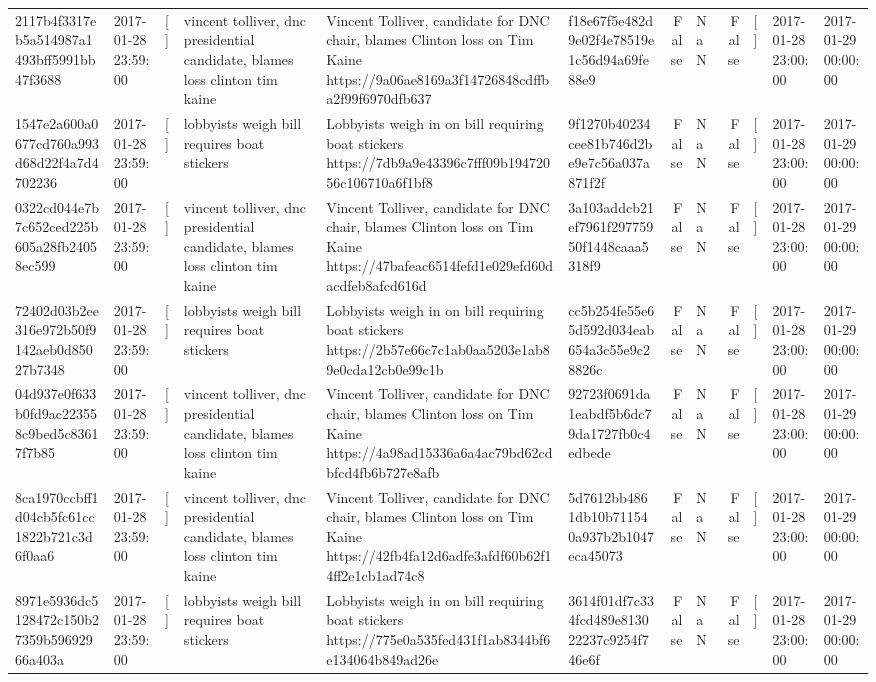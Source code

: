 \begin{tabular}{llllllrlrlll}
2117b4f3317eb5a514987a1493bff5991bb47f3688 & 2017-01-28 23:59:00 & [] & vincent tolliver, dnc presidential candidate, blames loss clinton tim kaine & Vincent Tolliver, candidate for DNC chair, blames Clinton loss on Tim Kaine https://9a06ae8169a3f14726848cdffba2f99f6970dfb637 & f18e67f5e482d9e02f4e78519e1c56d94a69fe88e9 & False & NaN & False & [] & 2017-01-28 23:00:00 & 2017-01-29 00:00:00 \\
1547e2a600a0677cd760a993d68d22f4a7d4702236 & 2017-01-28 23:59:00 & [] & lobbyists weigh bill requires boat stickers & Lobbyists weigh in on bill requiring boat stickers https://7db9a9e43396c7fff09b19472056c106710a6f1bf8 & 9f1270b40234cee81b746d2be9e7c56a037a871f2f & False & NaN & False & [] & 2017-01-28 23:00:00 & 2017-01-29 00:00:00 \\
0322cd044e7b7c652ced225b605a28fb24058ec599 & 2017-01-28 23:59:00 & [] & vincent tolliver, dnc presidential candidate, blames loss clinton tim kaine & Vincent Tolliver, candidate for DNC chair, blames Clinton loss on Tim Kaine https://47bafeac6514fefd1e029efd60dacdfeb8afcd616d & 3a103addcb21ef7961f29775950f1448caaa5318f9 & False & NaN & False & [] & 2017-01-28 23:00:00 & 2017-01-29 00:00:00 \\
72402d03b2ee316e972b50f9142aeb0d85027b7348 & 2017-01-28 23:59:00 & [] & lobbyists weigh bill requires boat stickers & Lobbyists weigh in on bill requiring boat stickers https://2b57e66c7c1ab0aa5203e1ab89e0cda12cb0e99c1b & cc5b254fe55e65d592d034eab654a3c55e9c28826c & False & NaN & False & [] & 2017-01-28 23:00:00 & 2017-01-29 00:00:00 \\
04d937e0f633b0fd9ac223558c9bed5c83617f7b85 & 2017-01-28 23:59:00 & [] & vincent tolliver, dnc presidential candidate, blames loss clinton tim kaine & Vincent Tolliver, candidate for DNC chair, blames Clinton loss on Tim Kaine https://4a98ad15336a6a4ac79bd62cdbfcd4fb6b727e8afb & 92723f0691da1eabdf5b6dc79da1727fb0c4edbede & False & NaN & False & [] & 2017-01-28 23:00:00 & 2017-01-29 00:00:00 \\
8ca1970ccbff1d04cb5fc61cc1822b721c3d6f0aa6 & 2017-01-28 23:59:00 & [] & vincent tolliver, dnc presidential candidate, blames loss clinton tim kaine & Vincent Tolliver, candidate for DNC chair, blames Clinton loss on Tim Kaine https://42fb4fa12d6adfe3afdf60b62f14ff2e1cb1ad74c8 & 5d7612bb4861db10b711540a937b2b1047eca45073 & False & NaN & False & [] & 2017-01-28 23:00:00 & 2017-01-29 00:00:00 \\
8971e5936dc5128472c150b27359b59692966a403a & 2017-01-28 23:59:00 & [] & lobbyists weigh bill requires boat stickers & Lobbyists weigh in on bill requiring boat stickers https://775e0a535fed431f1ab8344bf6e134064b849ad26e & 3614f01df7c334fcd489e813022237c9254f746e6f & False & NaN & False & [] & 2017-01-28 23:00:00 & 2017-01-29 00:00:00 \\

\end{tabular}
